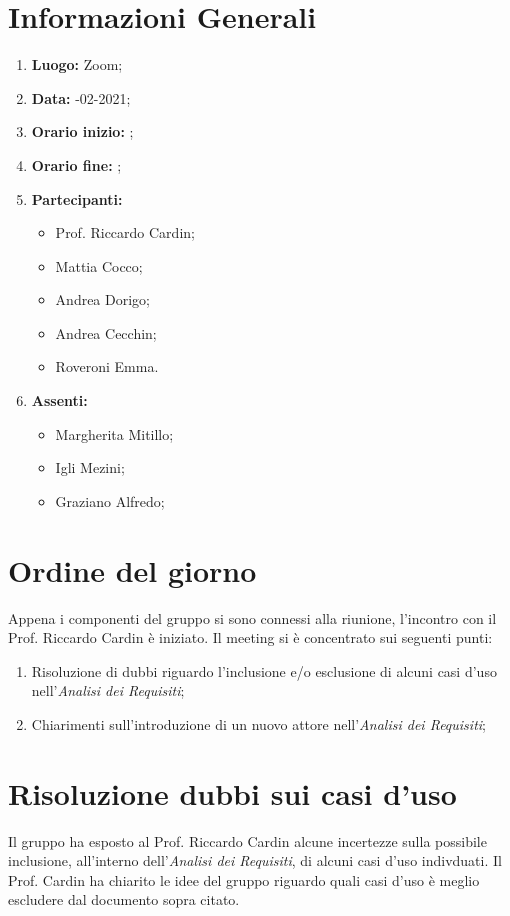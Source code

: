 \newpage
\section{Informazioni Generali}
\begin{enumerate}
	\item \textbf{Luogo:} \normalfont Zoom;
	\item \textbf{Data:} -02-2021;
	\item \textbf{Orario inizio:} ;
	\item \textbf{Orario fine:} ;
	\item \textbf{Partecipanti:}
	\begin{itemize}
		\item Prof. Riccardo Cardin;
		\item Mattia Cocco;
		\item Andrea Dorigo;
		\item Andrea Cecchin;
		\item Roveroni Emma.
	\end{itemize}
	\item \textbf{Assenti:}
	\begin{itemize}
		\item Margherita Mitillo;
		\item Igli Mezini;
		\item Graziano Alfredo;
	\end{itemize}
\end{enumerate}
\section{Ordine del giorno}
Appena i componenti del gruppo si sono connessi alla riunione, l'incontro con il Prof. Riccardo Cardin è iniziato.
Il meeting si è concentrato sui seguenti punti:
\begin{enumerate}
	\item Risoluzione di dubbi riguardo l'inclusione e/o esclusione di alcuni casi d'uso nell'\textit{Analisi dei Requisiti};
	\item Chiarimenti sull'introduzione di un nuovo attore nell'\textit{Analisi dei Requisiti};
\end{enumerate}
\section{Risoluzione dubbi sui casi d'uso}
Il gruppo ha esposto al Prof. Riccardo Cardin alcune incertezze sulla possibile inclusione, all'interno dell'\textit{Analisi dei Requisiti}, di alcuni casi d'uso indivduati. Il Prof. Cardin ha chiarito le idee del gruppo riguardo quali casi d'uso è meglio escludere dal documento sopra citato.
